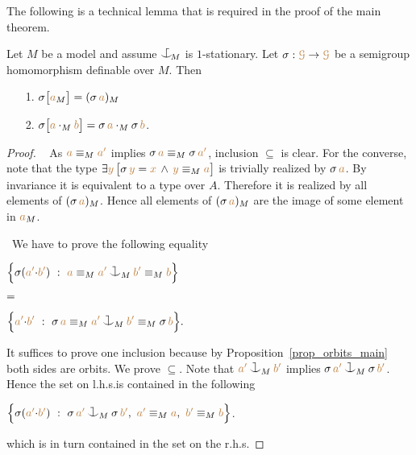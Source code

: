 \documentclass[creche.tex]{subfiles}
\begin{document}
The following is a technical lemma that is required in the proof of the main theorem.

\begin{proposition}\label{prop_HJ_tecnical}
Let $M$ be a model and assume $\nonforkc_{\!M}$ is $1$-stationary.
Let $\sigma:{\color{brown}\EuScript G}\to{\color{brown}\EuScript G}$ be a semigroup homomorphism definable over $M$.
Then 
\begin{itemize}
\item[1.] $\sigma\big[{\color{brown} a}_M\big]=(\sigma\,{\color{brown} a})_M$

\item[2.]
$\sigma\big[{\color{brown} a}\cdot_M{\color{brown} b}\big]=\sigma\,{\color{brown} a}\cdot_M\sigma\,{\color{brown} b}$.
\end{itemize}
\end{proposition}
\begin{proof}\   
As ${\color{brown} a}\equiv_M{\color{brown} a'}$ implies $\sigma\,{\color{brown} a}\equiv_M\sigma\,{\color{brown} a'}$,
inclusion $\subseteq$ is clear.
For the converse, note that the type 
$\exists{\color{brown}y}\,\big[\sigma\,{\color{brown} y}={\color{brown} x}\,\wedge\,{\color{brown} y}\equiv_M{\color{brown} a}\big]$ 
is trivially realized by $\sigma\,{\color{brown} a}$.
By invariance it is equivalent to a type over $A$.
Therefore it is realized by all elements of $(\sigma\,{\color{brown} a})_M$.
Hence all elements of $(\sigma\,{\color{brown} a})_M$ are the image of some element in ${\color{brown} a}_M$.

\def\medrel#1{\parbox[t]{6ex}{$\displaystyle\hfil #1$}}
\def\ceq#1#2#3{\parbox[t]{39ex}{$\displaystyle #1$}\medrel{#2}{$\displaystyle #3$}}
 \  
We have to prove the following equality\smallskip

\ceq{\hfill\Big\{\sigma({\mr a'}{\cdot}{\mr b'})\ :\ {\mr a}\equiv_M{\mr a'}\cnonfork_M{\mr b'}\equiv_M{\mr b} \Big\}}
{=}
{\Big\{{\mr a'}{\cdot}{\mr b'}\ :\ \sigma\,{\mr a}\equiv_M{\mr a'}\cnonfork_M{\mr b'}\equiv_M\sigma\,{\mr b} \Big\}.}\smallskip

It suffices to prove one inclusion because by Proposition~\ref{prop_orbits_main} both sides are orbits.
We prove $\subseteq$.
Note that ${\mr a'}\cnonfork_M{\mr b'}$ implies $\sigma\,{\mr a'}\cnonfork_M\sigma\,{\mr b'}$.
Hence the set on l.h.s.\@ is contained in the following\smallskip

\hfil$\Big\{\sigma({\mr a'}{\cdot}{\mr b'})\ :\ \sigma\,{\mr a'}\cnonfork_M\sigma\,{\mr b'},\ {\mr a'}\equiv_M{\mr a},\  {\mr b'}\equiv_M{\mr b} \Big\}$.\smallskip

which is in turn contained in the set on the r.h.s.
\end{proof}

\end{document}
